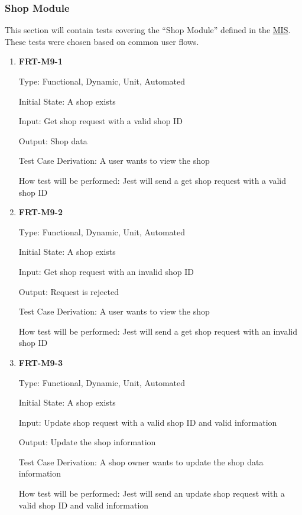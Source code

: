 \documentclass[12pt, titlepage]{article}
\begin{document}
\subsubsection{Shop Module}

This section will contain tests covering the ``Shop Module'' defined in the
\href{https://github.com/arkinmodi/project-sayyara/blob/main/docs/Design/SoftDetailedDes/MIS.pdf}{MIS}.
These tests were chosen based on common user flows.

\begin{enumerate}

	\item \textbf{FRT-M9-1}

	      Type: Functional, Dynamic, Unit, Automated

	      Initial State: A shop exists

	      Input: Get shop request with a valid shop ID

	      Output: Shop data

	      Test Case Derivation: A user wants to view the shop

	      How test will be performed: Jest will send a get shop request with a valid shop ID

	\item \textbf{FRT-M9-2}

	      Type: Functional, Dynamic, Unit, Automated

	      Initial State: A shop exists

	      Input: Get shop request with an invalid shop ID

	      Output: Request is rejected

	      Test Case Derivation: A user wants to view the shop

	      How test will be performed: Jest will send a get shop request with an invalid shop ID

	\item \textbf{FRT-M9-3}

	      Type: Functional, Dynamic, Unit, Automated

	      Initial State: A shop exists

	      Input: Update shop request with a valid shop ID and valid information

	      Output: Update the shop information

	      Test Case Derivation: A shop owner wants to update the shop data information

	      How test will be performed: Jest will send an update shop request with a valid shop ID and valid
	      information


\end{enumerate}
\end{document}
